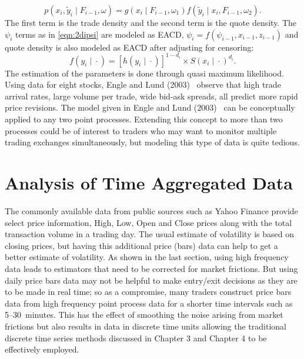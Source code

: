 	\begin{equation} \label{eqn:2pxiyi}
	p(x_i,\widetilde{y}_i \;|\; F_{i-1}, \omega) = g(x_i \;|\; F_{i-1}, \omega_1) f(\widetilde{y}_i \;|\; x_i, F_{i-1}, \omega_2).
	\end{equation}
The first term is the trade density and the second term is the quote density. The $\psi_i$ terms as in \eqref{eqn:2dipsi} are modeled as EACD, $\psi_i= f(\psi_{i-1}, x_{i-1}, z_{i-1})$ and quote density is also modeled as EACD after adjusting for censoring:
	\begin{equation} \label{eqn:2fdot}
	f(y_i \;|\; \cdot) = [h(y_i \;|\; \cdot)]^{1 - d_i} \times S(x_i \;|\; \cdot)^{d_i}.
	\end{equation}
The estimation of the parameters is done through quasi maximum likelihood. Using data for eight stocks, Engle and Lund (2003)~\cite{englelunde} observe that high trade arrival rates, large volume per trade, wide bid-ask spreads, all predict more rapid price revisions. The model given in Engle and Lund (2003)~\cite{englelunde} can be conceptually applied to any two point processes. Extending this concept to more than two processes could be of interest to traders who may want to monitor multiple trading exchanges simultaneously, but modeling this type of data is quite tedious. 


\section{Analysis of Time Aggregated Data \label{s:analysis_tad}}

The commonly available data from public sources such as Yahoo Finance provide select price information, High, Low, Open and Close prices along with the total transaction volume in a trading day. The usual estimate of volatility is based on closing prices, but having this additional price (bars) data can help to get a better estimate of volatility. As shown in the last section, using high frequency data leads to estimators that need to be corrected for market frictions. But using daily price bars data may not be helpful to make entry/exit decisions as they are to be made in real time; so as a compromise, many traders construct price bars data from high frequency point process data for a shorter time intervals such as 5--30~minutes. This has the effect of smoothing the noise arising from market frictions but also results in data in discrete time units allowing the traditional discrete time series methods discussed in Chapter 3 and Chapter 4 to be effectively employed. 



